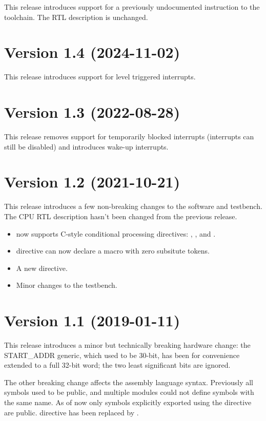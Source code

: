 \documentclass[a4paper,12pt,twoside,extrafontsizes]{memoir}
\begin{document}
This release introduces support for a previously undocumented  instruction to the toolchain. The RTL description is unchanged.

\section*{Version 1.4 (2024-11-02)}

This release introduces support for level triggered interrupts.

\section*{Version 1.3 (2022-08-28)}

This release removes support for temporarily blocked interrupts (interrupts can still be disabled) and introduces wake-up interrupts.

\section*{Version 1.2 (2021-10-21)}

This release introduces a few non-breaking changes to the software and testbench. The CPU RTL description hasn't been changed from the previous release.

\begin{itemize}
	\item {} now supports C-style conditional processing directives: , ,  and .
	\item {} directive can now declare a macro with zero subsitute tokens.
	\item A new  directive.
	\item Minor changes to the testbench.
\end{itemize}

\section*{Version 1.1 (2019-01-11)}

This release introduces a minor but technically breaking hardware change: the START\_ADDR generic, which used to be 30-bit, has been for convenience extended to a full 32-bit word; the two least significant bits are ignored.

The other breaking change affects the assembly language syntax. Previously all symbols used to be public, and multiple modules could not define symbols with the same name. As of now only symbols explicitly exported using the  directive are public.  directive has been replaced by .
\end{document}
